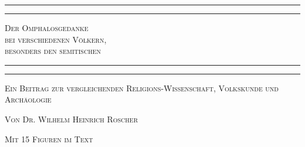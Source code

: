 \documentclass[a4paper, 11pt, oneside]{article}
\begin{document}
\renewcommand\thefootnote{{\bfseries\color{White}{\arabic{footnote}}}}
\let\oldfootnote\footnote
    \renewcommand{\footnote}[1]{\oldfootnote{{\normalsize\bfseries\color{White}#1}}}
\begin{titlepage} %
	\centering %

	
	\rule{\textwidth}{1.6pt}\vspace*{-\baselineskip}\vspace*{2pt} %
	\rule{\textwidth}{0.4pt} %
	
	\vspace{0.5\baselineskip} %
	
	{\scshape\Huge Der Omphalosgedanke \\bei verschiedenen Völkern, \\besonders den semitischen}
	
	\vspace{1\baselineskip} %

	\rule{\textwidth}{0.4pt}\vspace*{-\baselineskip}\vspace{3.2pt} %
	\rule{\textwidth}{1.6pt} %
	
	\vspace{0.5\baselineskip} %
	
	
        {\scshape Ein Beitrag zur vergleichenden Religions-Wissenschaft, Volkskunde und Archäologie} %
	
	\vspace*{0.5\baselineskip} %

        {\scshape Von \Large Dr. Wilhelm Heinrich Roscher}

	\vspace*{0.5\baselineskip} %

        {\scshape\small Mit 15 Figuren im Text}

	\vspace{0.25\baselineskip}



\end{titlepage}
\end{document}
